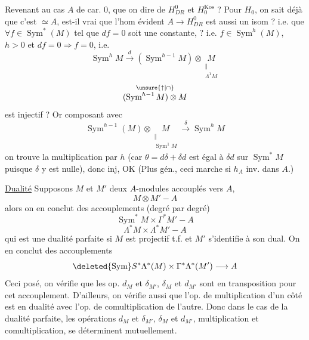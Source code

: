 Revenant au cas $A$ de car. $0$, que  on dire de $H^0_{DR}$ et $H_0^{\mathrm{Kos}}$ ? Pour $H_0$, on sait déjà que c'est $\simeq A$, est-il vrai que l'hom évident $A\longrightarrow H^0_{DR}$ est aussi un isom ?  i.e. que $\forall f\in\operatorname{Sym}^*(M)$ tel que $df=0$ soit  une constante, ? i.e.  $f\in\operatorname{Sym}^h(M)$, $h>0$ et $df=0\Longrightarrow f=0$, i.e.
\[
\operatorname{Sym}^hM\xrightarrow{d}(\operatorname{Sym}^{h-1}M)\otimes\underset{\substack{\Vert\\\Lambda^1M}}{M}
\]
\[
\overset{\unsure{\uparrow|\cap}}{(\operatorname{Sym}^{h-1}M)\otimes M}
\]
est injectif ? Or composant avec
\[
\operatorname{Sym}^{h-1}(M)\otimes\underset{\substack{\Vert\\\operatorname{Sym}^1M}}{M}\xrightarrow{\delta}\operatorname{Sym}^hM
\]
on trouve la multiplication par $h$ (car $\theta=d\delta+\delta d$ est égal à $\delta d$ sur $\operatorname{Sym}^*M$ puisque $\delta$ y est nulle), donc inj, OK (Plus gén., ceci marche si $h_A$ inv. dans $A$.)

\uline{Dualité} Supposons $M$ et $M'$ deux $A$-modules accouplés vers $A$,
\[
M\otimes M'-A
\]
alors on en conclut des accouplements (degré par degré)
\[
\operatorname{Sym}^*M\times\Gamma^*M'-A
\]
\[
\Lambda^*M\times\Lambda^*M'-A
\]
qui est une dualité parfaite si $M$ est projectif t.f. et $M'$ s'identifie à son dual. On en conclut des accouplements
\[
\deleted{\operatorname{Sym}}S^*\Lambda^*(M)\times\Gamma^*\Lambda^*(M')\longrightarrow A
\]
Ceci posé, on vérifie que les op. $d_M$ et $\delta_{M'}$, $\delta_M$ et $d_{M'}$ sont  en transposition pour cet accouplement. D'ailleurs, on vérifie aussi que l'op. de multiplication d'un côté est en dualité avec l'op. de comultiplication de l'autre. Donc dans le cas de la dualité parfaite, les opérations $d_M$ et $\delta_{M'}$, $\delta_M$ et $d_{M'}$, multiplication et comultiplication, se déterminent mutuellement.
